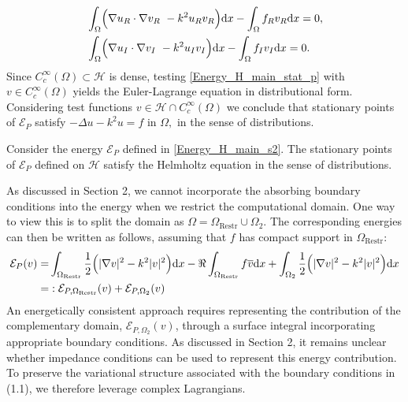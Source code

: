 \documentclass[twoside,11pt]{article}
\def\d{{\mathrm d}}
\def\Hc{{\mathscr H}}
\begin{document}
{\begin{equation}
\begin{split}
  &    \int_{\Omega }   \Bigl(     \nabla u _R \cdot \nabla v_R 
 \ - k^2  u_R   v_R \Bigr) \d x  -  \int_{\Omega }{   f_R}    v_R   \d  x   =  0  , \\
 &    \int_{\Omega }   \Bigl(     \nabla u _I \cdot \nabla v_I 
 \ - k^2  u_I   v_I \Bigr) \d x  -   {    \int_{\Omega } f_I    v_I   \d  x }  =  0  . \\ 
\end{split}
\end{equation}
{Since $C_c^\infty(\Omega)\subset \Hc$ is dense, testing \eqref{Energy_H_main_stat_p} with $v\in C_c^\infty(\Omega)$ yields the Euler-Lagrange equation in distributional form.}
Considering test functions $v\in \Hc \cap C ^\infty _ c (\Omega)$ we conclude that stationary points 
of $ \mathcal{E}_P  $  satisfy $- \Delta u - k^2 u = f$ in $ \Omega,$ 
in the sense of distributions.
\begin{proposition}
 Consider the energy $\mathcal{E}_P$ defined in \eqref{Energy_H_main_s2}. The stationary points of 
 $\mathcal{E}_P$ defined on $\Hc$ satisfy the Helmholtz equation in the sense of distributions.
\end{proposition}
{As discussed in Section 2, we cannot incorporate the absorbing boundary conditions into the energy when we restrict the computational domain. One way to view this is to split the domain as $\Omega = \Omega_{\text{Restr}} \cup \Omega_2$. The corresponding energies can then be written as follows, assuming that $f$ has compact support in $\Omega_{\text{Restr}}$:}
\begin{equation}\label{Energy_H_main_s2_2}
\begin{split}
\mathcal{E}_P(v) = &\int_{ \Omega _{\text{Restr}}  }  \frac12  \Bigl(    |\nabla v |^2 - k^2|v|^2 \Bigr)   \d x  -     \Re \int_{\Omega _{\text{Restr}}  } f   \overline{v}   \d  x  +  \int_{\Omega _{2} }  \frac12  \Bigl(    |\nabla v |^2 - k^2|v|^2 \Bigr)   \d x \\
=&: \mathcal{E}_{P, \Omega _{\text{Restr}} }(v) + \mathcal{E}_{P, \Omega _{2}}(v)
\end{split}\end{equation}
An energetically consistent approach requires representing the contribution of the complementary domain, $\mathcal{E}_{P, \Omega _{2}}(v)$,   through a surface integral incorporating appropriate boundary conditions.   As discussed in Section 2, it remains unclear whether impedance conditions can be used to represent this energy contribution. To preserve the variational structure associated with the boundary conditions in (1.1), we therefore leverage complex Lagrangians.

}
\end{document}
